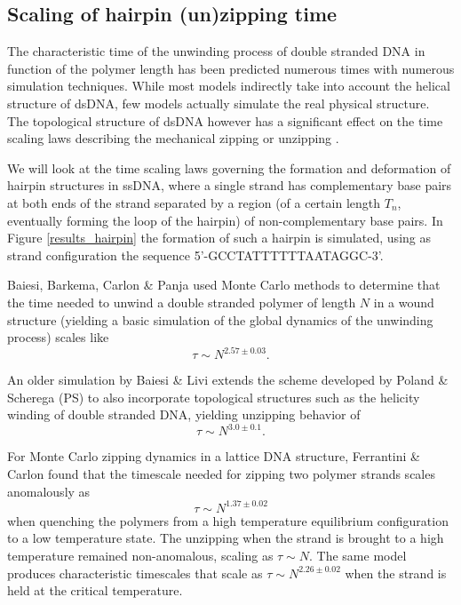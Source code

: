\subsection{Scaling of hairpin (un)zipping time}

The characteristic time of the unwinding process of double stranded DNA in function of the polymer length has been predicted numerous times with numerous simulation techniques. While most models indirectly take into account the helical structure of dsDNA, few models actually simulate the real physical structure. The topological structure of dsDNA however has a significant effect on the time scaling laws describing the mechanical zipping or unzipping \cite{carlon2010unwinding}.

We will look at the time scaling laws governing the formation and deformation of hairpin structures in ssDNA, where a single strand has complementary base pairs at both ends of the strand separated by a region (of a certain length $T_n$, eventually forming the loop of the hairpin) of non-complementary base pairs. In Figure \ref{results_hairpin} the formation of such a hairpin is simulated, using as strand configuration the sequence 5'-GCCTATTTTTTAATAGGC-3'. 

Baiesi, Barkema, Carlon \& Panja \cite{carlon2010unwinding} used Monte Carlo methods to determine that the time needed to unwind a double stranded polymer of length $N$ in a wound structure (yielding a basic simulation of the global dynamics of the unwinding process) scales like
\begin{equation}
\tau \sim N^{2.57\pm 0.03}.
\end{equation}

An older simulation by Baiesi \& Livi \cite{baiesi2009multiple} extends the scheme developed by Poland \& Scherega (PS) \cite{poland1966phase} to also incorporate topological structures such as the helicity winding of double stranded DNA, yielding unzipping behavior of
\begin{equation}
\tau \sim N^{3.0\pm 0.1}.
\end{equation}

For Monte Carlo zipping dynamics in a lattice DNA structure, Ferrantini \& Carlon \cite{carlon2011anomalous} found that the timescale needed for zipping two polymer strands scales anomalously as
\begin{equation}
\tau \sim N^{1.37\pm0.02}
\end{equation}
when quenching the polymers from a high temperature equilibrium configuration to a low temperature state. The unzipping when the strand is brought to a high temperature remained non-anomalous, scaling as $\tau \sim N$. The same model produces characteristic timescales that scale as $\tau \sim N^{2.26 \pm 0.02}$ when the strand is held at the critical temperature.

